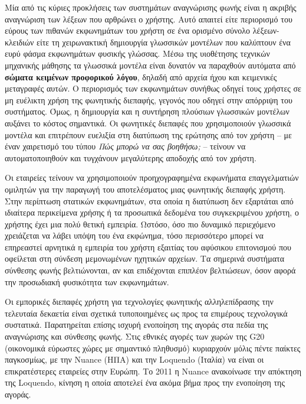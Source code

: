 \begin{multicols}{2}
Μία από τις κύριες προκλήσεις των συστημάτων αναγνώρισης φωνής είναι η ακριβής αναγνώριση των λέξεων που αρθρώνει ο χρήστης. Αυτό απαιτεί είτε περιορισμό του εύρους των πιθανών εκφωνημάτων του χρήστη σε ένα ορισμένο σύνολο λέξεων-κλειδιών είτε τη χειρωνακτική δημιουργία γλωσσικών μοντέλων που καλύπτουν ένα ευρύ φάσμα εκφωνημάτων φυσικής γλώσσας. Μέσω της υιοθέτησης τεχνικών μηχανικής μάθησης τα γλωσσικά μοντέλα είναι δυνατόν να παραχθούν αυτόματα από  \textbf{σώματα κειμένων προφορικού λόγου}, δηλαδή από αρχεία ήχου και κειμενικές μεταγραφές αυτών. Ο περιορισμός των εκφωνημάτων συνήθως οδηγεί τους χρήστες σε μη ευέλικτη χρήση της φωνητικής διεπαφής, γεγονός που οδηγεί στην απόρριψη του συστήματος. Όμως, η δημιουργία και η συντήρηση πλούσιων γλωσσικών μοντέλων αυξάνει το κόστος σημαντικά. Οι φωνητικές διεπαφές που χρησιμοποιούν γλωσσικά μοντέλα και επιτρέπουν ευελιξία στη διατύπωση της ερώτησης από τον  χρήστη  – με έναν χαιρετισμό  του τύπου \textit{Πώς μπορώ να σας βοηθήσω;} – τείνουν να αυτοματοποιηθούν και τυγχάνουν μεγαλύτερης αποδοχής από τον χρήστη.


Οι εταιρείες τείνουν να χρησιμοποιούν προηχογραφημένα εκφωνήματα επαγγελματιών ομιλητών για την παραγωγή του αποτελέσματος μιας φωνητικής διεπαφής χρήστη. Στην περίπτωση  στατικών εκφωνημάτων, στα οποία η διατύπωση δεν εξαρτάται από ιδιαίτερα περικείμενα χρήσης ή τα προσωπικά δεδομένα του συγκεκριμένου χρήστη, ο χρήστης έχει μια πολύ θετική εμπειρία. Ωστόσο, όσο πιο δυναμικό περιεχόμενο χρειάζεται να λάβει υπόψη του ένα εκφώνημα, τόσο περισσότερο μπορεί να επηρεαστεί αρνητικά η εμπειρία του χρήστη εξαιτίας του αφύσικου επιτονισμού που  οφείλεται στη σύνδεση μεμονωμένων ηχητικών αρχείων. Τα σημερινά συστήματα σύνθεσης φωνής βελτιώνονται, αν και επιδέχονται επιπλέον βελτιώσεων, όσον αφορά την προσωδιακή φυσικότητα των εκφωνημάτων.

Οι εμπορικές διεπαφές χρήστη για τεχνολογίες φωνητικής αλληλεπίδρασης την τελευταία δεκαετία είναι σχετικά τυποποιημένες ως προς τα επιμέρους τεχνολογικά συστατικά. Παρατηρείται επίσης ισχυρή ενοποίηση της αγοράς στα πεδία της αναγνώρισης και σύνθεσης φωνής. Στις εθνικές αγορές των χωρών της G20 (οικονομικά εύρωστες χώρες με σημαντικό πληθυσμό) κυριαρχούν μόλις πέντε παίκτες παγκοσμίως, με την Nuance (ΗΠΑ) και την Loquendo (Ιταλία) να είναι οι επικρατέστερες εταιρείες  στην Ευρώπη. Το 2011 η Nuance ανακοίνωσε την απόκτηση της Loquendo, κίνηση η οποία αποτελεί ένα ακόμα βήμα προς την ενοποίηση της αγοράς.


\end{multicols}
